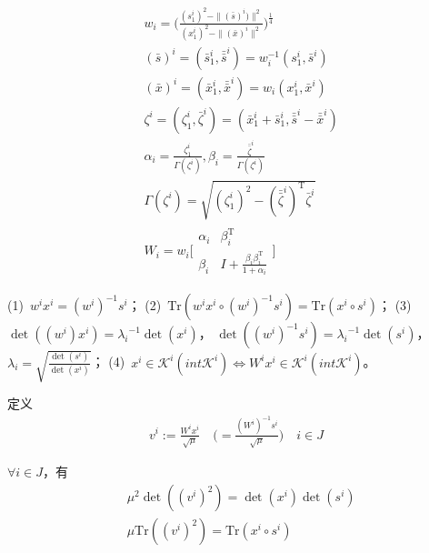             \begin{align*}
             & w_i=\bigg(\frac{(s_1^i)^2-\|(\bar{s})^i)\|^2}{(x_1^i)^2-\|(\bar{x})^i\|^2}\bigg)^{\frac 14}\\
             & (\bar{s})^i=({\bar{s}}_1^i,{\bar{\bar{s}}}^i)=w_i^{-1}(s_1^i,{\bar{s}}^i)\\
             & (\bar{x})^i=({\bar{x}}_1^i,{\bar{\bar{x}}}^i)=w_i(x_1^i,{\bar{x}}^i)\\
             & {\zeta}^i=({\zeta}^i_1,{\bar{\zeta}}^i)=({\bar{x}}_1^i+{\bar{s}}_1^i,{\bar{\bar{s}}}^i-{\bar{\bar{x}}}^i)\\
             & {\alpha}_i=\frac{{\zeta}_1^i}{\Gamma({\zeta}^i)},{\beta}_i=\frac{{\bar{\bar{\zeta}}}^i}{\Gamma({\zeta}^i)}\\
             & \Gamma({\zeta}^i)=\sqrt{({\zeta}_1^i)^2-({\bar{\bar{\zeta}}}^i)^\mathrm{T} {\bar{\zeta}}^i}\\
             & W_i=w_i\Bigg[\begin{matrix}{\alpha}_i&{\beta}_i^\mathrm{T} \\{\beta}_i&I+\frac{{\beta}_i{\beta}_i^\mathrm{T} }{1+{\alpha}_i}\end{matrix}\Bigg]
            \end{align*}
            \begin{lemma}[1]
            \par
            (1)\ $w^ix^i=(w^i)^{-1}s^i$；
            (2)\ $\mathrm{Tr}(w^ix^i\circ (w^i)^{-1}s^i)=\mathrm{Tr}(x^i\circ s^i)$；
            (3)\ $\det((w^i)x^i)={{\lambda}_i}^{-1} \det(x^i)$，
            $\det((w^i)^{-1}s^i)={{\lambda}_i}^{-1} \det(s^i)$，
            ${\lambda}_i=\sqrt{\frac{\det(s^i)}{\det(x^i)}}$；
            (4)\ $x^i\in \mathcal{K}^i(int{}\mathcal{K}^i)\Leftrightarrow W^ix^i \in \mathcal{K}^i(int{}\mathcal{K}^i)$。
            \end{lemma}
            \par
            定义
            \begin{align*}
             v^i:=\frac{W^ix^i}{\sqrt{\mu}}\quad \bigg(=\frac{(W^i)^{-1}s^i}{\sqrt{\mu}}\bigg)\quad i \in J
            \end{align*}
            \begin{lemma}
            $\forall i \in J$，有
            \begin{align*}
             &{\mu}^2\det((v^i)^2)=\det(x^i)\det(s^i)\\
             &\mu \mathrm{Tr}((v^i)^2)=\mathrm{Tr}(x^i\circ s^i)
            \end{align*}
            \end{lemma}
